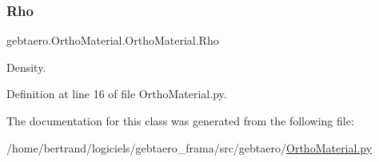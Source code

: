 \subsubsection{\texorpdfstring{Rho}{Rho}}
{\footnotesize\ttfamily gebtaero.\+Ortho\+Material.\+Ortho\+Material.\+Rho}



Density. 



Definition at line 16 of file Ortho\+Material.\+py.



The documentation for this class was generated from the following file\+:\begin{DoxyCompactItemize}
\item 
/home/bertrand/logiciels/gebtaero\+\_\+frama/src/gebtaero/\hyperlink{_ortho_material_8py}{Ortho\+Material.\+py}\end{DoxyCompactItemize}
